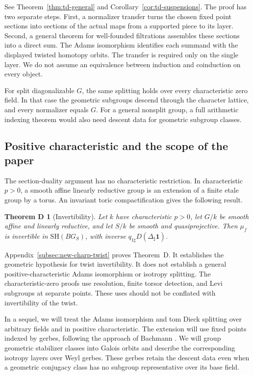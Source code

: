 \documentclass[11pt,reqno]{amsart}
\theoremstyle{definition}
\theoremstyle{remark}
\theoremstyle{plain}
\newtheorem*{charptheorem}{Theorem D}
\numberwithin{equation}{section}
\newcommand{\SH}{\mathrm{SH}}
\newcommand{\one}{\mathbf 1}
\begin{document}
See Theorem~\ref{thm:td-general} and Corollary~\ref{cor:td-suspensions}.
The proof has two separate steps.
First, a normalizer transfer turns the chosen fixed point sections into
sections of the actual maps from a supported piece to its layer.
Second, a general theorem for well-founded filtrations assembles these
sections into a direct sum.
The Adams isomorphism identifies each summand with the displayed
twisted homotopy orbits.
The transfer is required only on the single layer. We do not assume an
equivalence between induction and coinduction on every object.

For split diagonalizable \(G\), the same splitting holds over every
characteristic zero field. In that case the geometric subgroups descend
through the character lattice, and every normalizer equals \(G\).
For a general nonsplit group, a full arithmetic indexing theorem would
also need descent data for geometric subgroup classes.

\subsection{Positive characteristic and the scope of the paper}

The section-duality argument has no characteristic restriction.
In characteristic \(p>0\), a smooth affine linearly reductive group is
an extension of a finite etale group by a torus.
An invariant toric compactification gives the following result.

\begin{charptheorem}[Invertibility]
Let \(k\) have characteristic \(p>0\), let \(G/k\) be smooth affine and
linearly reductive, and let \(S/k\) be smooth and quasiprojective.
Then \(\mu_f\) is invertible in \(\SH(BG_S)\), with inverse
\(q_{1\sharp}D(\Delta_\sharp\one)\).
\end{charptheorem}

Appendix~\ref{subsec:new-charp-twist} proves Theorem~D.
It establishes the geometric hypothesis for twist invertibility.
It does not establish a general positive-characteristic Adams
isomorphism or isotropy splitting.
The characteristic-zero proofs use resolution, finite torsor detection,
and Levi subgroups at separate points.
These uses should not be conflated with invertibility of the twist.

In a sequel, we will treat the Adams isomorphism and tom Dieck splitting
over arbitrary fields and in positive characteristic.
The extension will use fixed points indexed by gerbes,
following the approach of Bachmann
\cite[Section~1.2.2]{bac22}.
We will group geometric stabilizer classes into Galois orbits and
describe the corresponding isotropy layers over Weyl gerbes.
These gerbes retain the descent data even when a geometric conjugacy
class has no subgroup representative over its base field.
\end{document}
